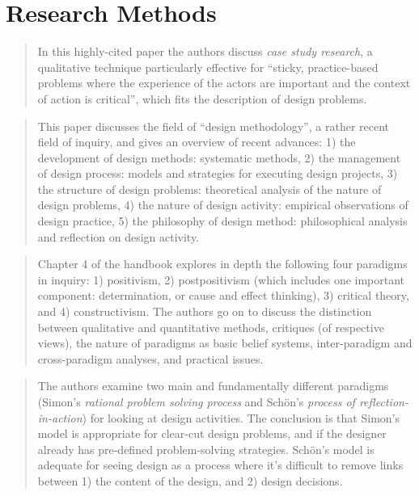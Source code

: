 
\clearpage
\section{Research Methods}

		\begin{quote}
		\small
		In this highly-cited paper the authors discuss {\em case study research},
		a qualitative technique particularly effective for 
		``sticky, practice-based problems where the experience of the actors are
		important and the context of action is critical'', which fits the description
		of design problems.
		\end{quote}

		\begin{quote}
		\small
		This paper discusses the field of 
		``design methodology'', a rather recent field of inquiry, and gives 
		an overview of recent advances:
		1) the development of design methods: systematic methods,
		2) the management of design process: models and strategies for executing design projects,
		3) the structure of design problems: theoretical analysis of the nature of design problems,
		4) the nature of design activity: empirical observations of design practice,
		5) the philosophy of design method: philosophical analysis and reflection on design activity.
		\end{quote}


		\begin{quote}
		\small
		Chapter 4 of the handbook explores in depth the following four paradigms in inquiry:
		1) positivism,
		2) postpositivism (which includes one important component: 
		determination, or cause and effect thinking),
		3) critical theory, and
		4) constructivism. The authors go on to discuss the distinction between qualitative
		and quantitative methods, critiques (of respective views), the nature of paradigms as
		basic belief systems, inter-paradigm and cross-paradigm analyses, and practical issues.
		\end{quote}

		\begin{quote}
		\small
		The authors examine two main and fundamentally different paradigms 
		(Simon's {\em rational problem solving process} and 
		Sch{\"o}n's {\em process of reflection-in-action}) 
		for looking at design activities. The conclusion is that Simon's model
		is appropriate for clear-cut design problems, and if the designer already has pre-defined
		problem-solving strategies.
		Sch{\"o}n's model is adequate for seeing design as a process where it's difficult
		to remove links between 1) the content of the design, and 2) design decisions.
		\end{quote}

